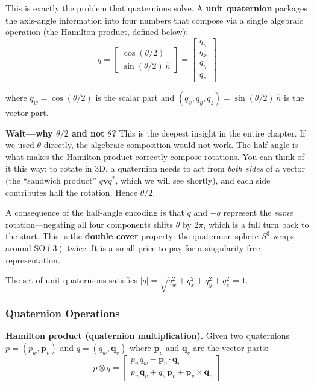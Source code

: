 This is exactly the problem that quaternions solve. A \textbf{unit quaternion} packages the axis-angle information into four numbers that compose via a single algebraic operation (the Hamilton product, defined below):
\begin{equation}
q = \begin{bmatrix} \cos(\theta/2) \\ \sin(\theta/2) \, \hat{n} \end{bmatrix}
= \begin{bmatrix} q_w \\ q_x \\ q_y \\ q_z \end{bmatrix}
\end{equation}

where $q_w = \cos(\theta/2)$ is the scalar part and $(q_x, q_y, q_z) = \sin(\theta/2)\,\hat{n}$ is the vector part.

\textbf{Wait---why $\theta/2$ and not $\theta$?} This is the deepest insight in the entire chapter. If we used $\theta$ directly, the algebraic composition would not work. The half-angle is what makes the Hamilton product correctly compose rotations. You can think of it this way: to rotate in 3D, a quaternion needs to act from \textit{both sides} of a vector (the ``sandwich product'' $q \mathbf{v} q^*$, which we will see shortly), and each side contributes half the rotation. Hence $\theta/2$.

A consequence of the half-angle encoding is that $q$ and $-q$ represent the \textit{same} rotation---negating all four components shifts $\theta$ by $2\pi$, which is a full turn back to the start. This is the \textbf{double cover} property: the quaternion sphere $S^3$ wraps around $\mathrm{SO}(3)$ twice. It is a small price to pay for a singularity-free representation.

The set of unit quaternions satisfies $|q| = \sqrt{q_w^2 + q_x^2 + q_y^2 + q_z^2} = 1$.

\subsubsection{Quaternion Operations}

\textbf{Hamilton product (quaternion multiplication).} Given two quaternions $p = (p_w, \mathbf{p}_v)$ and $q = (q_w, \mathbf{q}_v)$ where $\mathbf{p}_v$ and $\mathbf{q}_v$ are the vector parts:
\begin{equation}
p \otimes q = \begin{bmatrix}
p_w q_w - \mathbf{p}_v \cdot \mathbf{q}_v \\
p_w \mathbf{q}_v + q_w \mathbf{p}_v + \mathbf{p}_v \times \mathbf{q}_v
\end{bmatrix}
\end{equation}

